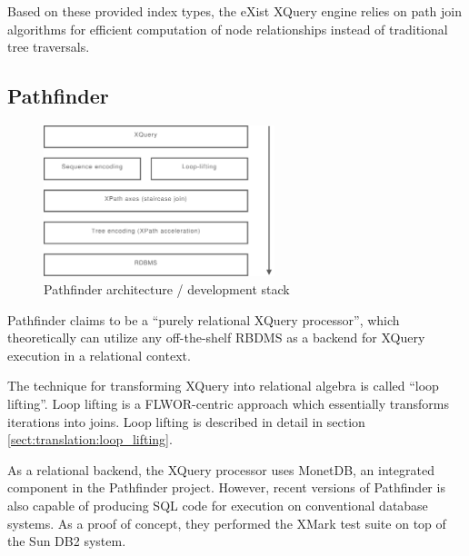 Based on these provided index types, the eXist XQuery engine relies on path
join algorithms\cite{exist_idx_drv_query} for efficient computation of node
relationships instead of traditional tree traversals. 

\subsection{Pathfinder}
\label{sect:theory:pathfinder}
\begin{figure}[h]
  \centering
    \includegraphics[width=0.6\textwidth]{diagrams/pathfinder_arch}
  \caption{Pathfinder architecture / development stack}
\end{figure}
Pathfinder\cite{pathfinderHome} claims to be a ``purely relational XQuery
processor'', which theoretically can utilize any off-the-shelf RBDMS as a
backend for XQuery execution in a relational context.

The technique for transforming XQuery into relational algebra is called ``loop
lifting''\cite{pathfinder_mothertongue}. Loop lifting is a FLWOR-centric
approach which essentially transforms iterations into joins. Loop lifting is
described in detail in section \ref{sect:translation:loop_lifting}.

As a relational backend, the XQuery processor uses MonetDB, an integrated
component in the Pathfinder project. However, recent versions of Pathfinder is
also capable of producing SQL code for execution on conventional database
systems. As a proof of concept, they performed the XMark test suite on top of
the Sun DB2 system\cite{pathfinder_sql}.

